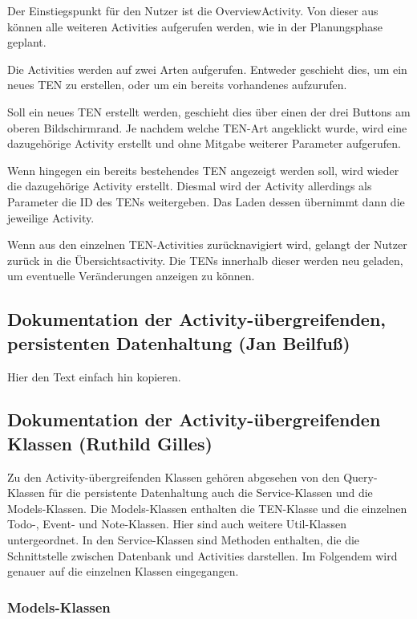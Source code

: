 Der Einstiegspunkt für den Nutzer ist die OverviewActivity. Von dieser aus können alle weiteren Activities aufgerufen werden, wie in der Planungsphase geplant.

Die Activities werden auf zwei Arten aufgerufen. Entweder geschieht dies, um ein neues TEN zu erstellen, oder um ein bereits vorhandenes aufzurufen.

Soll ein neues TEN erstellt werden, geschieht dies über einen der drei Buttons am oberen Bildschirmrand. Je nachdem welche TEN-Art angeklickt wurde, wird eine dazugehörige Activity erstellt und ohne Mitgabe weiterer Parameter aufgerufen.

Wenn hingegen ein bereits bestehendes TEN angezeigt werden soll, wird wieder die dazugehörige Activity erstellt. Diesmal wird der Activity allerdings als Parameter die ID des TENs weitergeben. Das Laden dessen übernimmt dann die jeweilige Activity.

Wenn aus den einzelnen TEN-Activities zurücknavigiert wird, gelangt der Nutzer zurück in die Übersichtsactivity. Die TENs innerhalb dieser werden neu geladen, um eventuelle Veränderungen anzeigen zu können.

\subsection{Dokumentation der Activity-übergreifenden, persistenten Datenhaltung (Jan Beilfuß)}

Hier den Text einfach hin kopieren.

\newpage
\subsection{Dokumentation der Activity-übergreifenden Klassen (Ruthild Gilles)}

Zu den Activity-übergreifenden Klassen gehören abgesehen von den Query-Klassen für die persistente Datenhaltung auch die Service-Klassen und die Models-Klassen. Die Models-Klassen enthalten die TEN-Klasse und die einzelnen Todo-, Event- und Note-Klassen. Hier sind auch weitere Util-Klassen untergeordnet. In den Service-Klassen sind Methoden enthalten, die die Schnittstelle zwischen Datenbank und Activities darstellen. Im Folgendem wird genauer auf die einzelnen Klassen eingegangen.

\subsubsection{Models-Klassen}

